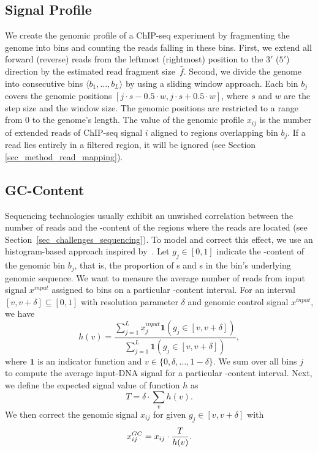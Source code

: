 \subsection{Signal Profile}
\label{sec_method_profile}
We create the genomic profile of a ChIP-seq experiment by fragmenting the genome into bins and counting the reads falling in these bins. 
First, we extend all forward (reverse) reads from the leftmost (rightmost) position to the $3'$ ($5'$) direction by the estimated read fragment size~$\hat{f}$. 
Second, we divide the genome into consecutive bins $\langle b_1, \ldots, b_L\rangle$ by using a sliding window approach. 
Each bin $b_j$ covers the genomic positions $[j \cdot s - 0.5 \cdot w, j \cdot s + 0.5 \cdot w]$, where $s$ and $w$ are the step size and the window size.
The genomic positions are restricted to a range from 0 to the genome's length.
The value of the genomic profile $x_{ij}$ is the number of extended reads of ChIP-seq signal $i$ aligned to regions overlapping bin $b_j$. 
If a read lies entirely in a filtered region, it will be ignored (see Section \ref{sec_method_read_mapping}). 


\subsection{GC-Content}
\label{sec_method_gccontent}
Sequencing technologies usually exhibit an unwished correlation between the number of reads and the -content of the regions where the reads are located (see Section~\ref{sec_challenges_sequencing}).
To model and correct this effect, we use an histogram-based approach inspired by~\cite{ashoor2013}. 
Let $g_j \in [0,1]$ indicate the -content of the genomic bin $b_j$, that is, the proportion of s and s in the bin's underlying genomic sequence. 
We want to measure the average number of reads from input signal $x^{input}$ assigned to bins on a particular -content interval. 
For an interval $[v,v+\delta] \subseteq [0,1]$ with resolution parameter $\delta$ and genomic control signal $x^{input}$, we have
$$
h(v) =  \frac{\sum_{j=1}^{L} x^{input}_{j} \mathbf{1}(g_j \in [v,v+\delta] )}{\sum_{j=1}^{L} \mathbf{1}(g_j \in [v,v+\delta])},
$$
where $\mathbf{1}$ is an indicator function and $v\in\{0, \delta, \ldots, 1-\delta\}$. 
We sum over all bins $j$ to compute the average input-DNA signal for a particular -content interval.
Next, we define the expected signal value of function $h$ as
$$T=\delta \cdot \sum_v h(v).$$
We then correct the genomic signal $x_{ij}$ for given $g_j \in [v,v+\delta]$ with
$$x_{ij}^{GC} =  x_{ij} \cdot \frac{T}{h(v)}.$$

